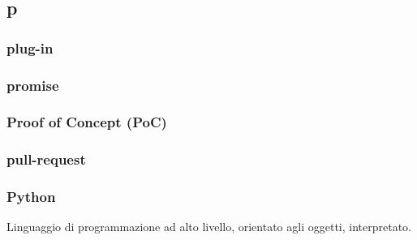 \subsection*{\textbf{\hfill \Huge{p} \hfill}} 
\subsubsection*{plug-in}

\subsubsection*{promise}

\subsubsection*{Proof of Concept (PoC)}

\subsubsection*{pull-request}

\subsubsection*{Python}
Linguaggio di programmazione ad alto livello, orientato agli oggetti, interpretato.
